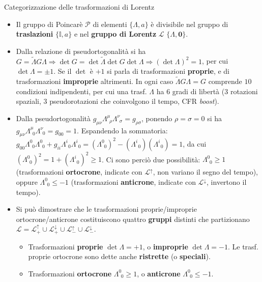 \documentclass[a4_2,grid,frame]{flashcards}
\newenvironment{cartaflash}
    {\vspace{-15pt}
    \begin{itemize}
    }
    {
    \end{itemize}
    }
\begin{document}
\begin{flashcard}[Proprietà]{Categorizzazione delle trasformazioni di Lorentz}
\begin{cartaflash}
\item Il gruppo di Poincarè $\mathcal{P}$ di elementi $\{\Lambda, a\}$ è divisibile nel gruppo di \textbf{traslazioni} $\{\mathbb{I}, a\}$ e nel \textbf{gruppo di Lorentz} $\mathcal{L}$ $\{\Lambda, \bm{0}\}$. 
\vspace{-7pt}
\item Dalla relazione di pseudortogonalità si ha $G = \tilde{\Lambda}G\Lambda \Rightarrow \operatorname{det} G = \operatorname{det}\tilde{\Lambda} \operatorname{det}G \operatorname{det}\Lambda \Rightarrow (\operatorname{det} \Lambda)^2 = 1$, per cui $\operatorname{det}\Lambda = \pm 1$. Se il $\operatorname{det}$ è $+1$ si parla di trasformazioni \textbf{proprie}, e di trasformazioni \textbf{improprie} altrimenti. In ogni caso $\tilde{\Lambda}G\Lambda = G$ comprende $10$ condizioni indipendenti, per cui una trasf. $\Lambda$ ha $6$ gradi di libertà ($3$ rotazioni spaziali, $3$ pseudorotazioni che coinvolgono il tempo, CFR \textit{boost}).
\vspace{-7pt}
\item Dalla pseudortogonalità $g_{\mu\nu}\Lambda_{\>\>\rho}^\mu \Lambda_{\>\>\sigma}^\nu = g_{\rho\sigma}$, ponendo $\rho = \sigma = 0$ si ha $g_{\mu\nu}\Lambda_{\>\>0}^\mu\Lambda_{\>\>0}^\nu = g_{00} = 1$. Espandendo la sommatoria: $g_{00}\Lambda_{\>\>0}^0\Lambda_{\>\>0}^0 + g_{ii}\Lambda_{\>\>0}^i\Lambda_{\>\>0}^i = (\Lambda_{\>\>0}^0)^2 - (\Lambda_{\>\>0}^i)(\Lambda_{\>\>0}^i) = 1$, da cui $(\Lambda_{\>\>0}^0)^2 = 1+(\Lambda_{\>\>0}^i)^2 \geq 1$. Ci sono perciò due possibilità: $\Lambda_{\>\>0}^0 \geq 1$ (trasformazioni \textbf{ortocrone}, indicate con $\mathcal{L}^{\uparrow}$, non variano il segno del tempo), oppure $\Lambda_{\>\>0}^0 \leq -1$ (trasformazioni \textbf{anticrone}, indicate con $\mathcal{L}^{\downarrow}$, invertono il tempo). 
\vspace{-7pt}
\item Si può dimostrare che le trasformazioni proprie/improprie ortocrone/anticrone costituiscono quattro \textbf{gruppi} distinti che partizionano $\mathcal{L} = \mathcal{L}_+^{\uparrow} \cup \mathcal{L}_+^{\downarrow} \cup \mathcal{L}_-^{\uparrow} \cup \mathcal{L}_-^{\downarrow}$.
\vspace{-7pt}
\begin{itemize}
    \item Trasformazioni \textbf{proprie} $\operatorname{det} \Lambda = +1$, o \textbf{improprie} $\operatorname{det} \Lambda = -1$. Le trasf. proprie ortocrone sono dette anche \textbf{ristrette} (o \textbf{speciali}).
    \item Trasformazioni \textbf{ortocrone} $\Lambda_{\>\>0}^0 \geq 1$, o \textbf{anticrone} $\Lambda_{\>\>0}^0 \leq -1$.
\end{itemize}
\end{cartaflash}
\end{flashcard}
\end{document}

